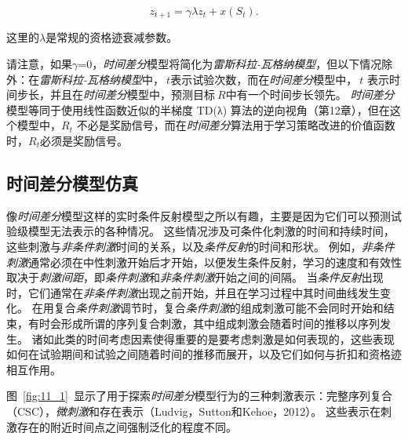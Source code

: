 \begin{equation}\label{key}
	z_{t+1} = \gamma \lambda z_t 
	+ x(S_t).
\end{equation}

这里的$\lambda$是常规的资格迹衰减参数。

请注意，如果$\gamma$=0，\textit{时间差分}模型将简化为\textit{雷斯科拉-瓦格纳模型}，但以下情况除外：在\textit{雷斯科拉-瓦格纳模型}中，$\ t$表示试验次数，而在\textit{时间差分}模型中，$\ t$
表示时间步长，并且在\textit{时间差分}模型中，预测目标$\ R$中有一个时间步长领先。
\textit{时间差分}模型等同于使用线性函数近似的半梯度 TD(λ) 算法的逆向视角（第12章），但在这个模型中，$ R_t$ 不必是奖励信号，而在\textit{时间差分}算法用于学习策略改进的价值函数时，$ R_t$必须是奖励信号。



\subsection{时间差分模型仿真} \label{sec:td_simulation}

像\textit{时间差分}模型这样的实时条件反射模型之所以有趣，主要是因为它们可以预测试验级模型无法表示的各种情况。
这些情况涉及可条件化刺激的时间和持续时间，这些刺激与\textit{非条件刺激}时间的关系，以及\textit{条件反射}的时间和形状。
例如，\textit{非条件刺激}通常必须在中性刺激开始后才开始，以便发生条件反射，学习的速度和有效性取决于\textit{刺激间距}，即\textit{条件刺激}和\textit{非条件刺激}开始之间的间隔。
当\textit{条件反射}出现时，它们通常在\textit{非条件刺激}出现之前开始，并且在学习过程中其时间曲线发生变化。
在用复合\textit{条件刺激}调节时，复合\textit{条件刺激}的组成刺激可能不会同时开始和结束，有时会形成所谓的序列复合刺激，其中组成刺激会随着时间的推移以序列发生。
诸如此类的时间考虑因素使得重要的是要考虑刺激是如何表现的，这些表现如何在试验期间和试验之间随着时间的推移而展开，以及它们如何与折扣和资格迹相互作用。


图~\ref{fig:11_1}~显示了用于探索\textit{时间差分}模型行为的三种刺激表示：完整序列复合（CSC），\textit{微刺激}和存在表示（Ludvig，Sutton和Kehoe，2012）。
这些表示在刺激存在的附近时间点之间强制泛化的程度不同。



